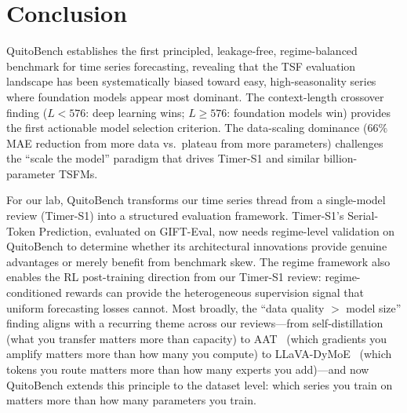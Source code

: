 \documentclass[11pt]{article}
\begin{document}
\section{Conclusion}

QuitoBench establishes the first principled, leakage-free, regime-balanced benchmark for time series forecasting, revealing that the TSF evaluation landscape has been systematically biased toward easy, high-seasonality series where foundation models appear most dominant. The context-length crossover finding ($L < 576$: deep learning wins; $L \geq 576$: foundation models win) provides the first actionable model selection criterion. The data-scaling dominance ($66\%$ MAE reduction from more data vs.\ plateau from more parameters) challenges the ``scale the model'' paradigm that drives Timer-S1 and similar billion-parameter TSFMs.

For our lab, QuitoBench transforms our time series thread from a single-model review (Timer-S1) into a structured evaluation framework. Timer-S1's Serial-Token Prediction, evaluated on GIFT-Eval, now needs regime-level validation on QuitoBench to determine whether its architectural innovations provide genuine advantages or merely benefit from benchmark skew. The regime framework also enables the RL post-training direction from our Timer-S1 review: regime-conditioned rewards can provide the heterogeneous supervision signal that uniform forecasting losses cannot. Most broadly, the ``data quality $>$ model size'' finding aligns with a recurring theme across our reviews---from self-distillation~\cite{selfdistill} (what you transfer matters more than capacity) to AAT~\cite{aat} (which gradients you amplify matters more than how many you compute) to LLaVA-DyMoE~\cite{dymoe} (which tokens you route matters more than how many experts you add)---and now QuitoBench extends this principle to the dataset level: which series you train on matters more than how many parameters you train.
\end{document}
